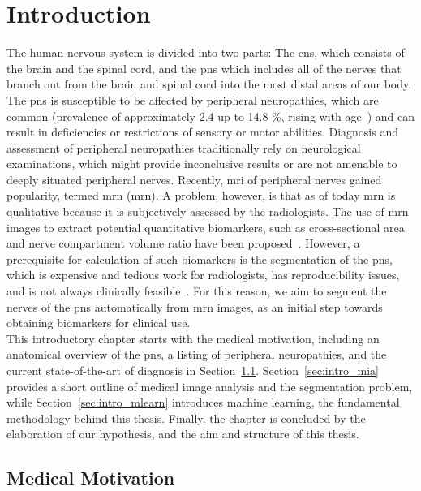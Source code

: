 \chapter{Introduction} %
The human nervous system is divided into two parts: The \gls{cns}, which consists of the brain and the spinal cord, and the \gls{pns} which includes all of the nerves that branch out from the brain and spinal cord into the most distal areas of our body. The \gls{pns} is susceptible to be affected by peripheral neuropathies, which are common (prevalence of approximately 2.4 up to 14.8 \%, rising with age~\cite{Martyn1997EpidemiologyNeuropathy,Gregg2004PrevalenceSurvey}) and can result in deficiencies or restrictions of sensory or motor abilities. Diagnosis and assessment of peripheral neuropathies traditionally rely on neurological examinations, which might provide inconclusive results or are not amenable to deeply situated peripheral nerves. Recently, \gls{mri} of peripheral nerves gained popularity, termed \acrlong{mrn} (\acrshort{mrn}). A problem, however, is that as of today \acrshort{mrn} is qualitative because it is subjectively assessed by the radiologists. The use of \acrshort{mrn} images to extract potential quantitative biomarkers, such as cross-sectional area and nerve compartment volume ratio have been proposed~\cite{Kronlage2017,Felisaz2017MRNeuropathy.,Balsiger2018SegmentationApproach}. However, a prerequisite for calculation of such biomarkers is the segmentation of the \gls{pns}, which is expensive and tedious work for radiologists, has reproducibility issues, and is not always clinically feasible~\cite{Porz2014Multi-modalMachine,Gillies2016Radiomics:Data}. For this reason, we aim to segment the nerves of the \gls{pns} automatically from \acrshort{mrn} images, as an initial step towards obtaining biomarkers for clinical use.\\
This introductory chapter starts with the medical motivation, including an anatomical overview of the \gls{pns}, a listing of peripheral neuropathies, and the current state-of-the-art of diagnosis in Section~\ref{sec:intro_medical}. Section~\ref{sec:intro_mia} provides a short outline of medical image analysis and the segmentation problem, while  Section~\ref{sec:intro_mlearn} introduces machine learning, the fundamental methodology behind this thesis. Finally, the chapter is concluded by the elaboration of our hypothesis, and the aim and structure of this thesis.

\section{Medical Motivation} \label{sec:intro_medical} %
